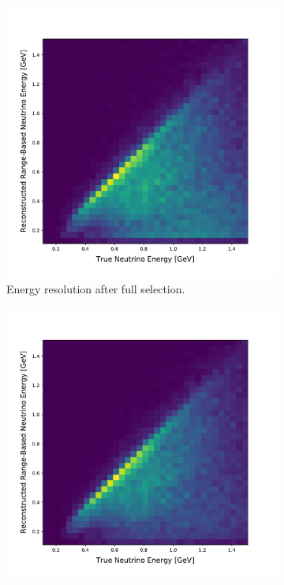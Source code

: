 \begin{figure}[]
\begin{center}
\begin{subfigure}[b]{0.45\textwidth}
    \end{subfigure} \newline
    \begin{subfigure}[b]{0.45\textwidth}
    \centering
    \includegraphics[width=1.00\textwidth]{NuMuCCsel/Images/Ryan/RangeBasedEnergyResolution.pdf}
    \caption{\label{fig:NuMUCCsel:ryan:Eres_noPQuality} Energy resolution after full selection.}
    \end{subfigure}
    \begin{subfigure}[b]{0.45\textwidth}
    \centering
    \includegraphics[width=1.00\textwidth]{NuMuCCsel/Images/Ryan/RangeBasedEnergyResolution_pquality.pdf}

\end{subfigure}
\end{center}
\end{figure}
